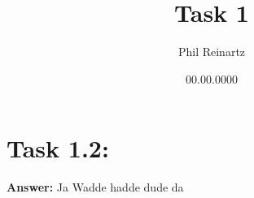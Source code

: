 \documentclass{article}
\title{Task 1}
\author{Phil Reinartz}
\date{00.00.0000}
\begin{document}
\maketitle

\section{Task 1.2:}

\textbf{Answer:} Ja Wadde hadde dude da
\end{document}
